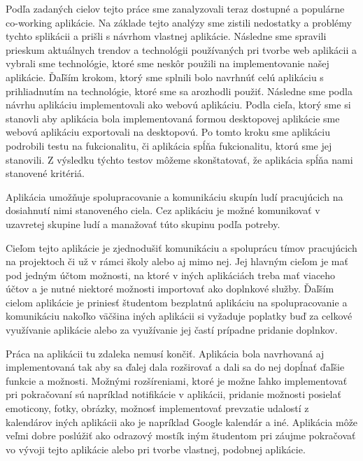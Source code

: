 \indent Podľa zadaných cielov tejto práce sme zanalyzovali teraz dostupné a populárne co-working aplikácie. Na základe tejto analýzy sme zistili nedostatky a problémy tychto splikácii a prišli s návrhom vlastnej aplikácie. Následne sme spravili prieskum aktuálnych trendov a technológii používaných pri tvorbe web aplikácii a vybrali sme technológie, ktoré sme neskôr použili na implementovanie našej aplikácie. Ďaľším krokom, ktorý sme splnili bolo navrhnúť celú aplikáciu s prihliadnutím na technológie, ktoré sme sa arozhodli použiť. Následne sme podla návrhu aplikáciu implementovali ako webovú aplikáciu. Podla cieľa, ktorý sme si stanovli aby aplikácia bola implementovaná formou desktopovej aplikácie sme webovú aplikáciu exportovali na desktopovú. Po tomto kroku sme aplikáciu podrobili testu na fukcionalitu, či aplikácia spĺňa fukcionalitu, ktorú sme jej stanovili. Z výsledku týchto testov môžeme skonštatovať, že aplikácia spĺňa nami stanovené kritériá.

\indent Aplikácia umožňuje spolupracovanie a komunikáciu skupín ludí pracujúcich na dosiahnutí nimi stanoveného ciela. Cez aplikáciu je možné komunikovať v uzavretej skupine ludí a manažovať túto skupinu podľa potreby.

\indent Cieľom tejto aplikácie je zjednodušiť komunikáciu a spoluprácu tímov pracujúcich na projektoch či už v rámci školy alebo aj mimo nej. Jej hlavným cieľom je mať pod jedným účtom možnosti, na ktoré v iných aplikáciách treba mať viaceho účtov a je nutné niektoré možnosti importovať ako doplnkové služby. Ďaľším cielom aplikácie je priniesť študentom bezplatnú aplikáciu na spolupracovanie a komunikáciu nakoľko väčšina iných aplikácii si vyžaduje poplatky buď za celkové využívanie aplikácie alebo za využívanie jej častí prípadne pridanie doplnkov. 

\indent Práca na aplikácii tu zdaleka nemusí končiť. Aplikácia bola navrhovaná aj implementovaná tak aby sa ďalej dala rozširovať a dali sa do nej dopĺnať ďaľšie funkcie a možnosti. Možnými rozšíreniami, ktoré je možne ľahko implementovať pri pokračovaní sú napríklad notifikácie v aplikácii, pridanie možnosti posielať emoticony, fotky, obrázky, možnosť implementovať prevzatie udalostí z kalendárov iných aplikácii ako je napríklad Google kalendár a iné. Aplikácia môže veľmi dobre poslúžiť ako odrazový mostík iným študentom pri záujme pokračovať vo vývoji tejto aplikácie alebo pri tvorbe vlastnej, podobnej aplikácie. 